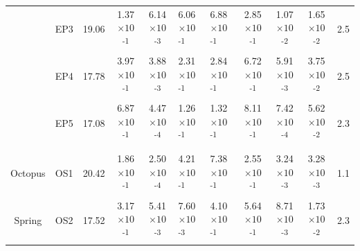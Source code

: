 {\begin{landscape}
\begin{table}
\begin{adjustbox}{width=600pt,keepaspectratio}
\begin{threeparttable}
\begin{tabular}{cccccllcccc}
      & EP3   & 19.06 & 1.37$\times 10$\textsuperscript{-1} & 6.14$\times 10$\textsuperscript{-3} & 6.06$\times 10$\textsuperscript{-1} & 6.88$\times 10$\textsuperscript{-1} & 2.85$\times 10$\textsuperscript{-1} & 1.07$\times 10$\textsuperscript{-2} & 1.65$\times 10$\textsuperscript{-2} & 2.5 \\
      & EP4   & 17.78 & 3.97$\times 10$\textsuperscript{-1} & 3.88$\times 10$\textsuperscript{-3} & 2.31$\times 10$\textsuperscript{-1} & 2.84$\times 10$\textsuperscript{-1} & 6.72$\times 10$\textsuperscript{-1} & 5.91$\times 10$\textsuperscript{-3} & 3.75$\times 10$\textsuperscript{-2} & 2.5 \\
      & EP5   & 17.08 & 6.87$\times 10$\textsuperscript{-1} & 4.47$\times 10$\textsuperscript{-4} & 1.26$\times 10$\textsuperscript{-1} & 1.32$\times 10$\textsuperscript{-1} & 8.11$\times 10$\textsuperscript{-1} & 7.42$\times 10$\textsuperscript{-4} & 5.62$\times 10$\textsuperscript{-2} & 2.3 \\
      &       &       &       &       &       &       &       &       &       &  \\
Octopus & OS1   & 20.42 & 1.86$\times 10$\textsuperscript{-1} & 2.50$\times 10$\textsuperscript{-4} & 4.21$\times 10$\textsuperscript{-1} & 7.38$\times 10$\textsuperscript{-1} & 2.55$\times 10$\textsuperscript{-1} & 3.24$\times 10$\textsuperscript{-3} & 3.28$\times 10$\textsuperscript{-3} & 1.1 \\
Spring & OS2   & 17.52 & 3.17$\times 10$\textsuperscript{-1} & 5.41$\times 10$\textsuperscript{-3} & 7.60$\times 10$\textsuperscript{-3} & 4.10$\times 10$\textsuperscript{-1} & 5.64$\times 10$\textsuperscript{-1} & 8.71$\times 10$\textsuperscript{-3} & 1.73$\times 10$\textsuperscript{-2} & 2.3 \\
\bottomrule
\end{tabular}%


\begin{tablenotes}
\item

\end{tablenotes}

  \label{tab:mods}
  \end{threeparttable}
  \end{adjustbox}
\end{table}

\end{landscape}
\doublespace
\clearpage
}


